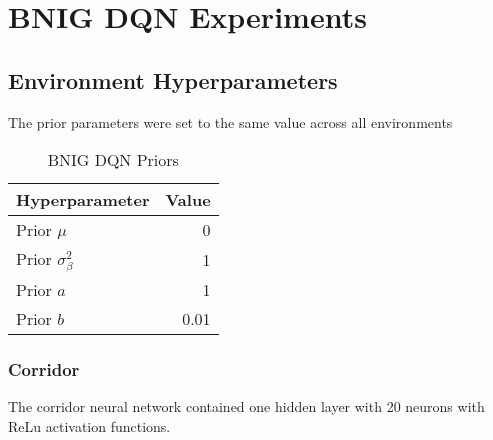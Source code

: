 {{\chapter{BNIG DQN Experiments}

\section{Environment Hyperparameters}

The prior parameters were set to the same value across all environments


\begin{table}[H]
    \centering
    \begin{tabular}{@{}lr@{}}
        \toprule
        Hyperparameter               & Value \\ \midrule
        Prior $\mu$                  & 0 \\
        Prior $\sigma_\beta^2$       & 1 \\
        Prior $a$                    & 1 \\
        Prior $b$                    & 0.01\\ \bottomrule
    \end{tabular}
    \caption{BNIG DQN Priors}
\end{table}

\subsection{Corridor}

The corridor neural network contained one hidden layer with 20 neurons with ReLu activation functions.

}}
